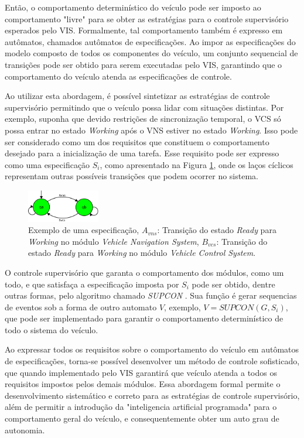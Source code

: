 \documentclass[conference]{IEEEtran}
\begin{document}
Então, o comportamento determinístico do veículo pode ser imposto ao comportamento "livre" para se obter as estratégias para o controle supervisório esperados pelo VIS. Formalmente, tal comportamento também é expresso em autômatos, chamados autômatos de especificações. 
Ao impor as especificações do modelo composto de todos os componentes do veículo, um conjunto sequencial de transições pode ser obtido para serem executadas pelo VIS, garantindo que o comportamento do veículo atenda as especificações de controle. 

Ao utilizar esta abordagem, é possível sintetizar as estratégias de controle supervisório permitindo que o veículo possa lidar com situações distintas. Por exemplo, suponha que devido restrições de sincronização temporal, o VCS só possa entrar no estado \textit{Working} após o VNS estiver no estado \textit{Working}. Isso pode ser considerado como um dos requisitos que constituem o comportamento desejado para a inicialização de uma tarefa. Esse requisito pode ser expresso como uma especificação $S_{i}$, como apresentado na Figura \ref{fig:VILMA_TRANSITION_EXAMPLE}, onde os laços cíclicos representam outras possíveis transições que podem ocorrer no sistema.

\begin{figure}[h]
	\centering
	\includegraphics[width=120px,keepaspectratio]{imagens/VILMA_TRANSITION_EXAMPLE}
	\caption{Exemplo de uma especificação, $A_{vns}$: Transição do estado \textit{Ready} para \textit{Working} no módulo \textit{Vehicle Navigation System}, $B_{vcs}$: Transição do estado \textit{Ready} para \textit{Working} no módulo \textit{Vehicle Control System}.}
	\label{fig:VILMA_TRANSITION_EXAMPLE}
\end{figure}

O controle supervisório que garanta o comportamento dos módulos, como um todo, e que satisfaça a especificação imposta por $S_{i}$ pode ser obtido, dentre outras formas, pelo algoritmo chamado \textit{SUPCON} \cite{supcom_wonham1987supremal}. Sua função é gerar sequencias de eventos sob a forma de outro automato $V$, exemplo, $ V = SUPCON(G,S_{i})$, que pode ser implementado para garantir o comportamento determinístico de todo o sistema do veículo.

Ao expressar todos os requisitos sobre o comportamento do veículo em autômatos de especificações, torna-se possível desenvolver um método de controle sofisticado, que quando implementado pelo VIS garantirá que veículo atenda a todos os requisitos impostos pelos demais módulos. Essa abordagem formal permite o desenvolvimento sistemático e correto para as estratégias de controle supervisório, além de permitir a introdução da "inteligencia artificial programada" para o comportamento geral do veículo, e consequentemente obter um auto grau de autonomia.
\end{document}
